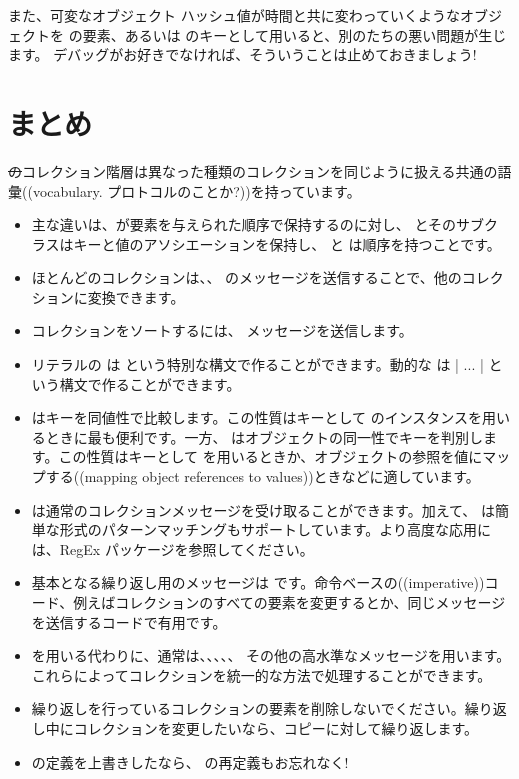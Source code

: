\documentclass[a4paper,10pt,twoside]{book}
\begin{document}
また、可変なオブジェクト \ie ハッシュ値が時間と共に変わっていくようなオブジェクトを  の要素、あるいは  のキーとして用いると、別のたちの悪い問題が生じます。
デバッグがお好きでなければ、そういうことは止めておきましょう!

\section{まとめ}

\st のコレクション階層は異なった種類のコレクションを同じように扱える共通の語彙((vocabulary. プロトコルのことか?))を持っています。

\begin{itemize}
  \item 主な違いは、が要素を与えられた順序で保持するのに対し、 とそのサブクラスはキーと値のアソシエーションを保持し、 と は順序を持つことです。
  \item ほとんどのコレクションは、、 \etc のメッセージを送信することで、他のコレクションに変換できます。
  \item コレクションをソートするには、 メッセージを送信します。
  \item リテラルの  は  という特別な構文で作ることができます。動的な  は \ct|{ ... }| という構文で作ることができます。
  \item {} はキーを同値性で比較します。この性質はキーとして  のインスタンスを用いるときに最も便利です。一方、 はオブジェクトの同一性でキーを判別します。この性質はキーとして  を用いるときか、オブジェクトの参照を値にマップする((mapping object references to values))ときなどに適しています。
  \item {} は通常のコレクションメッセージを受け取ることができます。加えて、 は簡単な形式のパターンマッチングもサポートしています。より高度な応用には、RegEx パッケージを参照してください。
  \item 基本となる繰り返し用のメッセージは  です。命令ベースの((imperative))コード、例えばコレクションのすべての要素を変更するとか、同じメッセージを送信するコードで有用です。
  \item {} を用いる代わりに、通常は、、、、、 その他の高水準なメッセージを用います。これらによってコレクションを統一的な方法で処理することができます。
  \item 繰り返しを行っているコレクションの要素を削除しないでください。繰り返し中にコレクションを変更したいなら、コピーに対して繰り返します。
  \item \ct{=} の定義を上書きしたなら、 の再定義もお忘れなく!
\end{itemize}

\ifx\wholebook\relax\else
   
   
\end{document}
